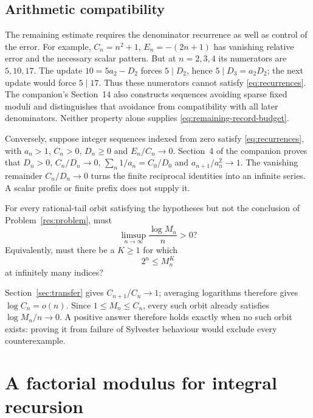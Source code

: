 \documentclass[11pt]{article}
\begin{document}
\subsection{Arithmetic compatibility}\label{sec:scalar-limit}
The remaining estimate requires the denominator recurrence as well as
control of the error. For example, $C_n=n^2+1$, $E_n=-(2n+1)$ has vanishing
relative error and the necessary scalar pattern. But at $n=2,3,4$ its
numerators are $5,10,17$. The update $10=5a_2-D_2$ forces $5\mid D_2$,
hence $5\mid D_3=a_2D_2$; the next update would force $5\mid17$.
Thus these numerators cannot satisfy \eqref{eq:recurrences}. The companion's Section~14 also constructs
sequences avoiding sparse fixed moduli and distinguishes that avoidance
from compatibility with all later denominators. Neither property alone
supplies \eqref{eq:remaining-record-budget}.

Conversely, suppose integer sequences indexed from zero satisfy
\eqref{eq:recurrences}, with $a_n>1$, $C_n>0$, $D_n\ge0$ and
$E_n/C_n\to0$. Section~4 of the companion proves that $D_n>0$,
$C_n/D_n\to0$, $\sum_n1/a_n=C_0/D_0$ and $a_{n+1}/a_n^2\to1$.
The vanishing remainder $C_n/D_n\to0$ turns the finite reciprocal
identities into an infinite series. A scalar profile or finite prefix
does not supply it.

\begin{problem}\label{res:lcmheight}
For every rational-tail orbit satisfying the hypotheses but not the conclusion of Problem~\ref{res:problem},
must
\[
 \limsup_{n\to\infty}\frac{\log M_n}{n}>0?
\]
Equivalently, must there be a $K\ge1$ for which
\[
 2^n\le M_n^K
\]
at infinitely many indices?
\end{problem}
Section~\ref{sec:transfer} gives $C_{n+1}/C_n\to1$; averaging logarithms
therefore gives $\log C_n=o(n)$. Since $1\le M_n\le C_n$, every such
orbit already satisfies $\log M_n/n\to0$. A positive answer therefore
holds exactly when no such orbit exists: proving it from failure of
Sylvester behaviour would exclude every counterexample.

\appendix
\section{A factorial modulus for integral recursion}\label{app:residue}
\end{document}
